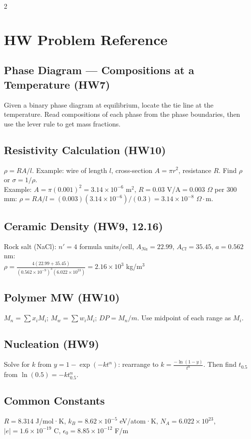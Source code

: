 \documentclass[8pt]{extarticle}
\begin{document}
\begin{multicols*}{2}
\section*{HW Problem Reference}
\subsection*{Phase Diagram — Compositions at a Temperature (HW7)}
Given a binary phase diagram at equilibrium, locate the tie line at the temperature. Read compositions of each phase from the phase boundaries, then use the lever rule to get mass fractions.
\subsection*{Resistivity Calculation (HW10)}
$\rho = RA/l$. Example: wire of length $l$, cross-section $A=\pi r^2$, resistance $R$. Find $\rho$ or $\sigma=1/\rho$. \\
Example: $A=\pi(0.001)^2=3.14\times10^{-6}$ m$^2$, $R=0.03$ V/A$=0.003$ $\Omega$ per 300 mm: $\rho=RA/l = (0.003)(3.14\times10^{-6})/(0.3) = 3.14\times10^{-8}$ $\Omega\cdot$m.
\subsection*{Ceramic Density (HW9, 12.16)}
Rock salt (NaCl): $n'=4$ formula units/cell, $A_{Na}=22.99$, $A_{Cl}=35.45$, $a=0.562$ nm: \\
$\rho = \frac{4(22.99+35.45)}{(0.562\times10^{-9})^3(6.022\times10^{23})} = 2.16\times10^3$ kg/m$^3$
\subsection*{Polymer MW (HW10)}
$M_n=\sum x_i M_i$; $M_w=\sum w_i M_i$; $DP=M_n/m$. Use midpoint of each range as $M_i$.
\subsection*{Nucleation (HW9)}
Solve for $k$ from $y=1-\exp(-kt^n)$: rearrange to $k=\frac{-\ln(1-y)}{t^n}$. Then find $t_{0.5}$ from $\ln(0.5)=-kt_{0.5}^n$.
\subsection*{Common Constants}
$R=8.314$ J/mol·K, $k_B=8.62\times10^{-5}$ eV/atom·K, $N_A=6.022\times10^{23}$, $|e|=1.6\times10^{-19}$ C, $\epsilon_0=8.85\times10^{-12}$ F/m

\end{multicols*}
\end{document}
